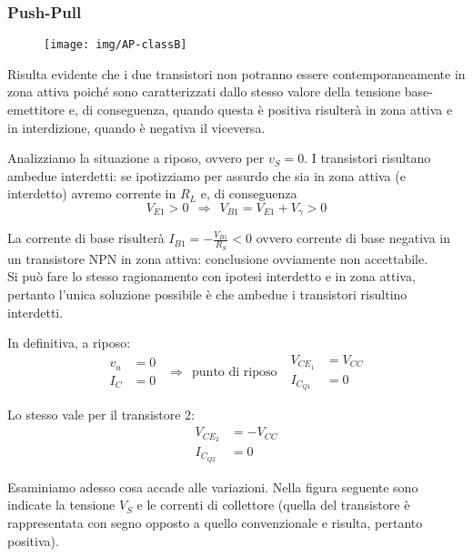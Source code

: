 \subsubsection{Push-Pull}

\begin{figure}[hbt]
\centering
\texttt{[image: img/AP-classB]}
\caption{}
\label{fig:ap-classb}
\end{figure}

Risulta evidente che i due transistori non potranno essere contemporaneamente in zona attiva poiché sono caratterizzati dallo stesso valore della tensione base-emettitore e, di conseguenza, quando questa è positiva risulterà  in zona attiva e  in interdizione, quando è negativa il
viceversa.

Analizziamo la situazione a riposo, ovvero per $v_S = 0$. I transistori risultano ambedue interdetti: se ipotizziamo per assurdo che  sia in zona attiva
(e  interdetto) avremo corrente in $R_L$ e, di conseguenza $$ V_{E1} > 0 
~~\Rightarrow~~
V_{B1} = V_{E1} + V_\gamma > 0$$

La corrente di base risulterà $I_{B1} = - \frac{V_{B1}}{R_S} < 0$ ovvero corrente di base negativa in un transistore NPN in zona attiva: conclusione ovviamente non accettabile.\\
Si può fare lo stesso ragionamento con ipotesi  interdetto e  in zona attiva, pertanto l'unica soluzione possibile è che ambedue i transistori risultino interdetti.

In definitiva, a riposo:
$$
\begin{aligned}
v_u & = 0\\
I_C & = 0
\end{aligned}
~~\Rightarrow~~
\mbox{punto di riposo}
~~~
\begin{aligned}
V_{CE_1} & = V_{CC}\\
I_{C_{Q1}} & = 0
\end{aligned}
$$

Lo stesso vale per il transistore 2:
$$
\begin{aligned}
V_{CE_2} & = -V_{CC}\\
I_{C_{Q2}} & = 0
\end{aligned}
$$

Esaminiamo adesso cosa accade alle variazioni. Nella figura seguente sono indicate la tensione $V_S$ e le correnti di collettore (quella del transistore  è rappresentata con segno opposto a quello convenzionale e risulta, pertanto positiva).


